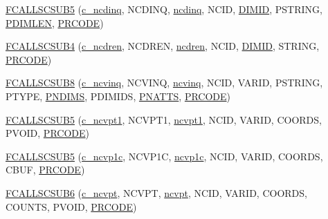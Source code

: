 \begin{DoxyCompactItemize}
\hyperlink{fort-v2compat_8c_a12ee5114ed329211614492afea1a67a9}{F\+C\+A\+L\+L\+S\+C\+S\+U\+B5} (\hyperlink{nf__v2compat_8c_a9bb20b1a81299cccacc6a3116f17b55a}{c\+\_\+ncdinq}, N\+C\+D\+I\+NQ, \hyperlink{nf__fortv2_8f90_a6ee036c798e7436b1d962c7dfc8a6957}{ncdinq}, N\+C\+ID, \hyperlink{ncfortran_8h_affac6052df8e434d04708ecc3986d215}{D\+I\+M\+ID}, P\+S\+T\+R\+I\+NG, \hyperlink{fort-v2compat_8c_a966419668dc6e6f3e34bc743e56397a6}{P\+D\+I\+M\+L\+EN}, \hyperlink{fort-v2compat_8c_ae2352f39cbd25bcaf1bedbbb12db73fe}{P\+R\+C\+O\+DE})
\item 
\hyperlink{fort-v2compat_8c_ac24148f7e8193ab62ab0eb344b99c56a}{F\+C\+A\+L\+L\+S\+C\+S\+U\+B4} (\hyperlink{nf__v2compat_8c_a8dc48f9e3a4048402e8f86f26d4fed20}{c\+\_\+ncdren}, N\+C\+D\+R\+EN, \hyperlink{nf__fortv2_8f90_ade22791003f60c336b970147d68ceae3}{ncdren}, N\+C\+ID, \hyperlink{ncfortran_8h_affac6052df8e434d04708ecc3986d215}{D\+I\+M\+ID}, S\+T\+R\+I\+NG, \hyperlink{fort-v2compat_8c_ae2352f39cbd25bcaf1bedbbb12db73fe}{P\+R\+C\+O\+DE})
\item 
\hyperlink{fort-v2compat_8c_a0892717e2482b175ac5d0da166cbe6e9}{F\+C\+A\+L\+L\+S\+C\+S\+U\+B8} (\hyperlink{nf__v2compat_8c_a8fc2cc586a6874bbf28afd044e4f929c}{c\+\_\+ncvinq}, N\+C\+V\+I\+NQ, \hyperlink{nf__fortv2_8f90_a58c204fe024e1315e38a953ffc8bb3c9}{ncvinq}, N\+C\+ID, V\+A\+R\+ID, P\+S\+T\+R\+I\+NG, P\+T\+Y\+PE, \hyperlink{ncfortran_8h_a1e5068f5fb9f0e8cc1f30a297226ab7d}{P\+N\+D\+I\+MS}, P\+D\+I\+M\+I\+DS, \hyperlink{ncfortran_8h_a36a5825a51824435de6731632e2aa61c}{P\+N\+A\+T\+TS}, \hyperlink{fort-v2compat_8c_ae2352f39cbd25bcaf1bedbbb12db73fe}{P\+R\+C\+O\+DE})
\item 
\hyperlink{fort-v2compat_8c_a682aab2eac9878efe2fa07d8c24ac6f0}{F\+C\+A\+L\+L\+S\+C\+S\+U\+B5} (\hyperlink{nf__v2compat_8c_ad869819911f33dfb9cf47f60647d59f4}{c\+\_\+ncvpt1}, N\+C\+V\+P\+T1, \hyperlink{nf__fortv2_8f90_a193fa468237c9fe5b4c4182a49ae0030}{ncvpt1}, N\+C\+ID, V\+A\+R\+ID, C\+O\+O\+R\+DS, P\+V\+O\+ID, \hyperlink{fort-v2compat_8c_ae2352f39cbd25bcaf1bedbbb12db73fe}{P\+R\+C\+O\+DE})
\item 
\hyperlink{fort-v2compat_8c_a107f17c85f547d1a82b7add74d35fc59}{F\+C\+A\+L\+L\+S\+C\+S\+U\+B5} (\hyperlink{nf__v2compat_8c_ab52acaf18740d16c37e45ebe900ef853}{c\+\_\+ncvp1c}, N\+C\+V\+P1C, \hyperlink{nf__fortv2_8f90_ae86fd9a6227f59f53db68f523802428c}{ncvp1c}, N\+C\+ID, V\+A\+R\+ID, C\+O\+O\+R\+DS, C\+B\+UF, \hyperlink{fort-v2compat_8c_ae2352f39cbd25bcaf1bedbbb12db73fe}{P\+R\+C\+O\+DE})
\item 
\hyperlink{fort-v2compat_8c_acbc5b23349d9fffa6fbf7205138dac99}{F\+C\+A\+L\+L\+S\+C\+S\+U\+B6} (\hyperlink{nf__v2compat_8c_a103ae6935428dfecde0657594a2206f6}{c\+\_\+ncvpt}, N\+C\+V\+PT, \hyperlink{nf__fortv2_8f90_a0e80dc4b1c7ad7772f48f31480a61237}{ncvpt}, N\+C\+ID, V\+A\+R\+ID, C\+O\+O\+R\+DS, C\+O\+U\+N\+TS, P\+V\+O\+ID, \hyperlink{fort-v2compat_8c_ae2352f39cbd25bcaf1bedbbb12db73fe}{P\+R\+C\+O\+DE})

\end{DoxyCompactItemize}
